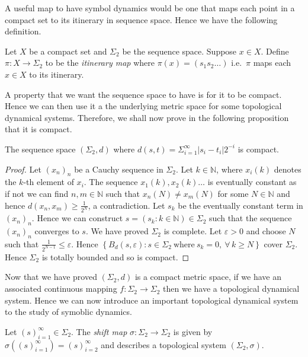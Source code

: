 A useful map to have symbol dynamics would be one that maps each point in a compact set to its itinerary in sequence space. Hence we have the following definition.

\begin{defn} \label{defn:itinerary-map}
    Let $X$ be a compact set and $\Sigma_2$ be the sequence space. Suppose $x \in X$. Define $\pi : X \to \Sigma_2$ to be the \emph{itinerary map} where $\pi(x) = (s_1s_2\dots)$ i.e.\ $\pi$ maps each $x \in X$ to its itinerary.
\end{defn}

A property that we want the sequence space to have is for it to be compact. Hence we can then use it a the underlying metric space for some topological dynamical systems. Therefore, we shall now prove in the following proposition that it is compact.

\begin{prop}
    The sequence space $(\Sigma_2, d)$ where $d(s, t) = \Sigma_{i=1}^{\infty}|s_i - t_i|2^{-i}$ is compact.
    \begin{proof}
        Let $(x_n)_n$ be a Cauchy sequence in $\Sigma_2$. Let $k \in \mathbb{N}$, where $x_i(k)$ denotes the $k$-th element of $x_i$. The sequence $x_1(k),x_2(k)\dots$ is eventually constant as if not we can find $n, m \in \mathbb{N}$ such that $x_n(N) \neq x_m(N)$ for some $N \in \mathbb{N}$ and hence $d(x_n, x_m) \geq \frac{1}{2^N}$, a contradiction. Let $s_k$ be the eventually constant term in $(x_n)_n$. Hence we can construct $s = ( s_k : k \in \mathbb{N} ) \in \Sigma_2$ such that the sequence $(x_n)_n$ converges to $s$. We have proved $\Sigma_2$ is complete. Let $\varepsilon > 0$ and choose $N$ such that $\frac{1}{2^{N - 1}} \leq \varepsilon$. Hence $\left\lbrace B_d(s, \varepsilon) : s \in \Sigma_2 \ \text{where} \ s_k = 0, \ \forall\, k \geq N\right\rbrace$ cover $\Sigma_2$. Hence $\Sigma_2$ is totally bounded and so is compact.
    \end{proof}
\end{prop}

Now that we have proved $(\Sigma_2, d)$ is a compact metric space, if we have an associated continuous mapping $f: \Sigma_2 \to \Sigma_2$ then we have a topological dynamical system. Hence we can now introduce an important topological dynamical system to the study of symoblic dynamics.

\begin{defn} 
    Let $(s)_{i=1}^{\infty} \in \Sigma_2$. The \emph{shift map} $\sigma: \Sigma_2 \to \Sigma_2$ is given by $\sigma \left((s)_{i=1}^{\infty}\right) = (s)_{i=2}^{\infty}$ and describes a topological system $(\Sigma_2, \sigma)$.
\end{defn}

